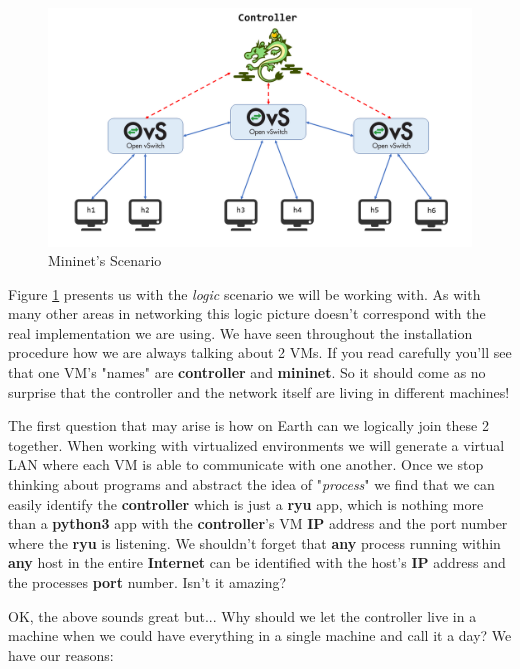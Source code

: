 \documentclass[12pt]{report}
\newcommand{\newpar} {
    \vskip 1cm
}
\begin{document}
		\begin{figure}
			\centering
			\includegraphics[scale = 1]{scenario.png}
			\caption{Mininet's Scenario}
			\label{f:scenario}
		\end{figure}

		Figure \ref{f:scenario} presents us with the \textit{logic} scenario we will be working with. As with many other areas in networking this logic picture doesn't correspond with the real implementation we are using. We have seen throughout the installation procedure how we are always talking about 2 VMs. If you read carefully you'll see that one VM's "names" are \textbf{controller} and \textbf{mininet}. So it should come as no surprise that the controller and the network itself are living in different machines!
		\newpar
		The first question that may arise is how on Earth can we logically join these 2 together. When working with virtualized environments we will generate a virtual LAN where each VM is able to communicate with one another. Once we stop thinking about programs and abstract the idea of "\textit{process}" we find that we can easily identify the \textbf{controller} which is just a \textbf{ryu} app, which is nothing more than a \textbf{python3} app with the \textbf{controller}'s VM \textbf{IP} address and the port number where the \textbf{ryu} is listening. We shouldn't forget that \textbf{any} process running within \textbf{any} host in the entire \textbf{Internet} can be identified with the host's \textbf{IP} address and the processes \textbf{port} number. Isn't it amazing?
		\newpar
		OK, the above sounds great but... Why should we let the controller live in a machine when we could have everything in a single machine and call it a day? We have our reasons:
\end{document}
